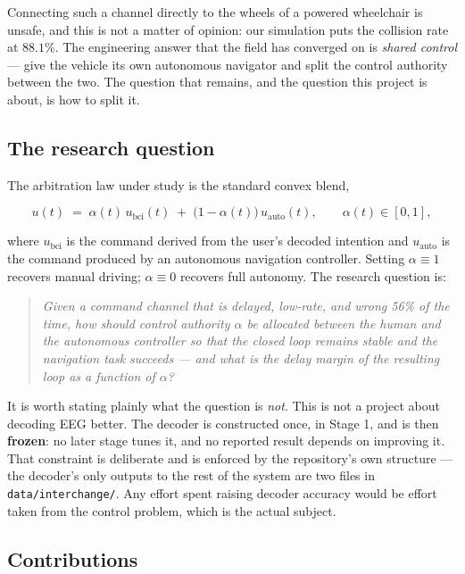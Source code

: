 \documentclass[11pt,a4paper]{article}
\newcommand{\ubci}{u_{\mathrm{bci}}}
\newcommand{\uauto}{u_{\mathrm{auto}}}
\theoremstyle{plain}
\theoremstyle{definition}
\begin{document}
Connecting such a channel directly to the wheels of a powered
wheelchair is unsafe, and this is not a matter of opinion: our
simulation puts the collision rate at $88.1\%$. The engineering answer
that the field has converged on is \emph{shared control} --- give the
vehicle its own autonomous navigator and split the control authority
between the two. The question that remains, and the question this
project is about, is how to split it.

\subsection{The research question}

The arbitration law under study is the standard convex blend,

\begin{equation}
u(t) \;=\; \alpha(t)\,\ubci(t) \;+\; \bigl(1-\alpha(t)\bigr)\,\uauto(t),
\qquad \alpha(t) \in [0,1],
\label{eq:arb}
\end{equation}

where $\ubci$ is the command derived from the user's decoded intention
and $\uauto$ is the command produced by an autonomous navigation
controller. Setting $\alpha \equiv 1$ recovers manual driving;
$\alpha \equiv 0$ recovers full autonomy. The research question is:

\begin{quote}
\itshape
Given a command channel that is delayed, low-rate, and wrong 56\% of
the time, how should control authority $\alpha$ be allocated between the
human and the autonomous controller so that the closed loop remains
stable and the navigation task succeeds --- and what is the
delay margin of the resulting loop as a function of $\alpha$?
\end{quote}

It is worth stating plainly what the question is \emph{not}. This is
not a project about decoding EEG better. The decoder is constructed
once, in Stage 1, and is then \textbf{frozen}: no later stage tunes it,
and no reported result depends on improving it. That constraint is
deliberate and is enforced by the repository's own structure --- the
decoder's only outputs to the rest of the system are two files in
\texttt{data/interchange/}. Any effort spent raising decoder accuracy
would be effort taken from the control problem, which is the actual
subject.

\subsection{Contributions}
\end{document}
